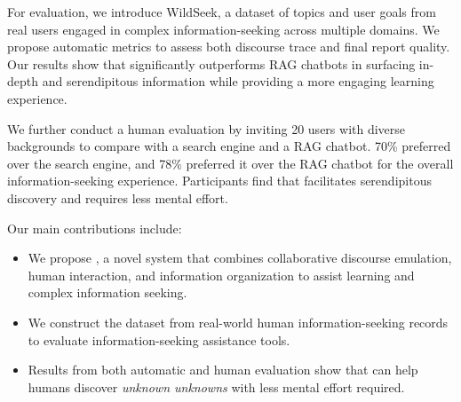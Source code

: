 \documentclass[11pt]{article}
\begin{document}
For evaluation, we introduce WildSeek, a dataset of topics and user goals from real users engaged in complex information-seeking across multiple domains. We propose automatic metrics to assess both discourse trace and final report quality. Our results show that \system significantly outperforms RAG chatbots in surfacing in-depth and serendipitous information while providing a more engaging learning experience.%


We further conduct a human evaluation by inviting 20 users with diverse backgrounds to compare \system with a search engine and a RAG chatbot. 70\% preferred \system over the search engine, and 78\% preferred it over the RAG chatbot for the overall information-seeking experience. Participants find that \system facilitates serendipitous discovery and requires less mental effort.%



Our main contributions include:
\begin{itemize}
    \item {We propose \system, a novel system that combines collaborative discourse emulation, human interaction, and information organization to assist learning and complex information seeking.}%
    \item {We construct the \data dataset from real-world human information-seeking records to evaluate information-seeking assistance tools.}
    \item {Results from both automatic and human evaluation show that \system can help humans discover \textit{unknown unknowns} with less mental effort required.}
\end{itemize}
\end{document}
